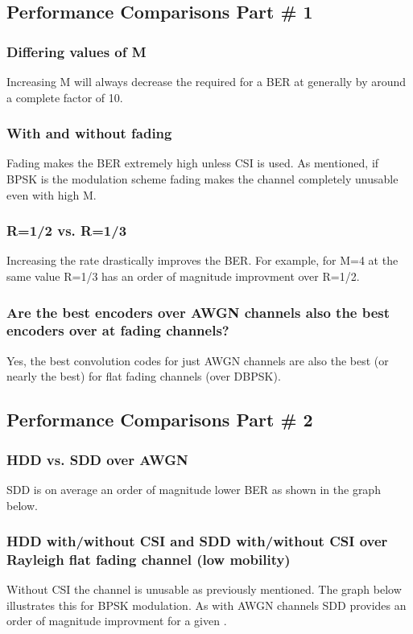 \documentclass[a4paper,10pt]{article}
\begin{document}
\subsection{Performance Comparisons Part \# 1}

\subsubsection{Differing values of M}
Increasing M will always decrease the required \ebno for a BER at \ber generally by around a complete factor of 10. 
\subsubsection{With and without fading}
Fading makes the BER extremely high unless CSI is used. As mentioned, if BPSK is the modulation scheme fading makes the channel completely unusable even with high M.
\subsubsection{R=1/2 vs. R=1/3}
Increasing the rate drastically improves the BER. For example, for M=4 at the same \ebno value R=1/3 has an order of magnitude improvment over R=1/2.
\subsubsection{Are the best encoders over AWGN channels also the best encoders over at fading
channels?}
Yes, the best convolution codes for just AWGN channels are also the best (or nearly the best) for flat fading channels (over DBPSK).

\subsection{Performance Comparisons Part \# 2}

\subsubsection{HDD vs. SDD over AWGN}
SDD is on average an order of magnitude lower BER as shown in the graph below.

\subsubsection{HDD with/without CSI and SDD with/without CSI over Rayleigh flat fading channel (low mobility)}
Without CSI the channel is unusable as previously mentioned. The graph below illustrates this for BPSK modulation. As with AWGN channels SDD provides an order of magnitude improvment for a given \ebno.
\end{document}
